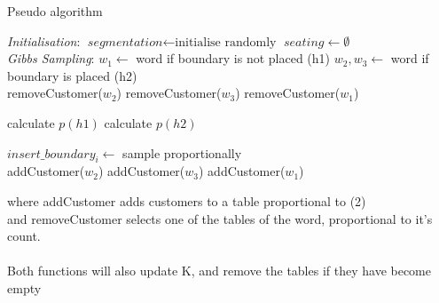 \begin{algorithm}
\caption{Pseudo algorithm}\label{euclid}
\begin{algorithmic}[1]
\BState \emph{Initialisation}:
\State $\textit{segmentation} \gets \text{initialise randomly}$
\State $seating \gets \emptyset$
\EndFor
\\
\BState \emph{Gibbs Sampling}:
	\State $w_1 \gets$ word if boundary is not placed (h1)
	\State $w_2, w_3 \gets$ word if boundary is  placed (h2)
	\\
		\State removeCustomer($w_2$)
		\State removeCustomer($w_3$)
	\Else
		\State removeCustomer($w_1$)	
	\EndIf

	\State calculate $p(h1)$
	\State calculate $p(h2)$
	
	\State $insert\_boundary_i \gets$ sample proportionally
	\\
		\State addCustomer($w_2$)
		\State addCustomer($w _3$)
	\Else 
		\State addCustomer($w_1$)	
	\EndIf
\EndFor
\EndProcedure
\end{algorithmic}
\end{algorithm}

	
where addCustomer adds customers to a table proportional to (2) \\
and removeCustomer selects one of the tables of the word, proportional to it's count. \\
\\
Both functions will also update K, and remove the tables if they have become empty